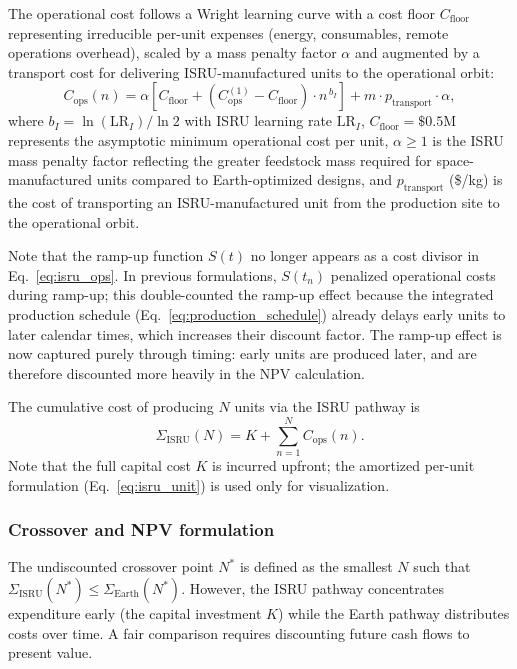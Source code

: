 \documentclass[preprint,12pt]{elsarticle}
\begin{document}
The operational cost follows a Wright learning curve with a cost floor $C_{\mathrm{floor}}$ representing irreducible per-unit expenses (energy, consumables, remote operations overhead), scaled by a mass penalty factor $\alpha$ and augmented by a transport cost for delivering ISRU-manufactured units to the operational orbit:
\begin{equation}
  C_{\mathrm{ops}}(n) = \alpha \left[ C_{\mathrm{floor}} + \left(C_{\mathrm{ops}}^{(1)} - C_{\mathrm{floor}}\right) \cdot n^{\,b_I} \right] + m \cdot p_{\mathrm{transport}} \cdot \alpha,
  \label{eq:isru_ops}
\end{equation}
where $b_I = \ln(\mathrm{LR}_I)/\ln 2$ with ISRU learning rate $\mathrm{LR}_I$, $C_{\mathrm{floor}} = \$0.5$M represents the asymptotic minimum operational cost per unit, $\alpha \geq 1$ is the ISRU mass penalty factor reflecting the greater feedstock mass required for space-manufactured units compared to Earth-optimized designs, and $p_{\mathrm{transport}}$ (\$/kg) is the cost of transporting an ISRU-manufactured unit from the production site to the operational orbit.

Note that the ramp-up function $S(t)$ no longer appears as a cost divisor in Eq.~\ref{eq:isru_ops}. In previous formulations, $S(t_n)$ penalized operational costs during ramp-up; this double-counted the ramp-up effect because the integrated production schedule (Eq.~\ref{eq:production_schedule}) already delays early units to later calendar times, which increases their discount factor. The ramp-up effect is now captured purely through timing: early units are produced later, and are therefore discounted more heavily in the NPV calculation.

The cumulative cost of producing $N$ units via the ISRU pathway is
\begin{equation}
  \Sigma_{\mathrm{ISRU}}(N) = K + \sum_{n=1}^{N} C_{\mathrm{ops}}(n).
  \label{eq:isru_cum}
\end{equation}
Note that the full capital cost $K$ is incurred upfront; the amortized per-unit formulation (Eq.~\ref{eq:isru_unit}) is used only for visualization.

\subsubsection{Crossover and NPV formulation}

The undiscounted crossover point $N^*$ is defined as the smallest $N$ such that $\Sigma_{\mathrm{ISRU}}(N^*) \leq \Sigma_{\mathrm{Earth}}(N^*)$. However, the ISRU pathway concentrates expenditure early (the capital investment $K$) while the Earth pathway distributes costs over time. A fair comparison requires discounting future cash flows to present value.
\end{document}
